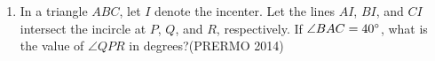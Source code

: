 \begin{enumerate}
\item In a triangle $ABC$, let $I$ denote the incenter. Let the lines $AI$, $BI$, and $CI$ intersect the incircle at $P$, $Q$, and $R$, respectively. If $\angle BAC = 40\degree$, what is the value of $\angle QPR$ in degrees?\hfill(PRERMO 2014)
\end{enumerate}
